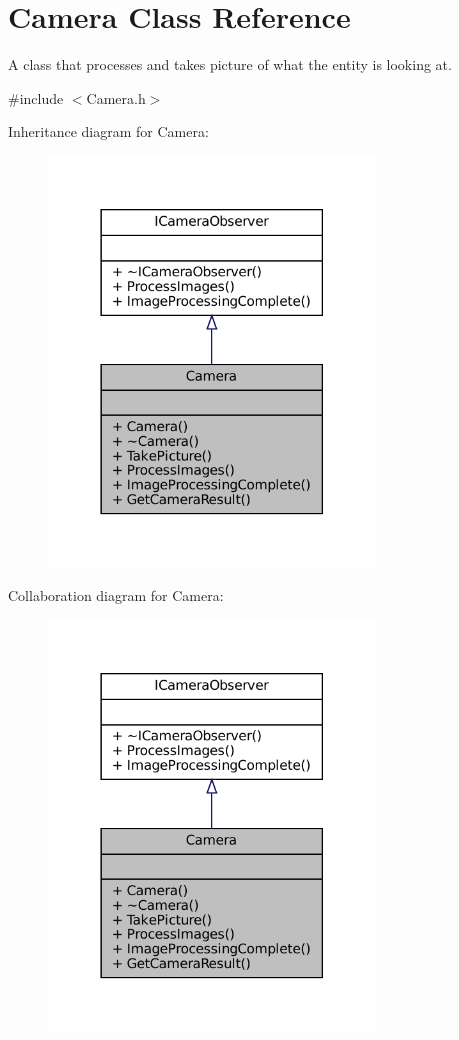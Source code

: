 \hypertarget{classCamera}{}\section{Camera Class Reference}
\label{classCamera}


A class that processes and takes picture of what the entity is looking at.  




{\ttfamily \#include $<$Camera.\+h$>$}



Inheritance diagram for Camera\+:\nopagebreak
\begin{figure}[H]
\begin{center}
\leavevmode
\includegraphics[width=246pt]{classCamera__inherit__graph}
\end{center}
\end{figure}


Collaboration diagram for Camera\+:\nopagebreak
\begin{figure}[H]
\begin{center}
\leavevmode
\includegraphics[width=246pt]{classCamera__coll__graph}
\end{center}
\end{figure}
